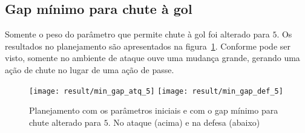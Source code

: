 \subsection{Gap mínimo para chute à gol}
Somente o peso do parâmetro que permite chute à gol
foi alterado para $5$. Os resultados no planejamento são
apresentados na figura~\ref{fig:min_gap_5}. Conforme pode
ser visto, somente no ambiente de ataque ouve uma
mudança grande, gerando uma ação de chute no lugar de
uma ação de passe.
\begin{figure}[H]
  \centering
  \texttt{[image: result/min\_gap\_atq\_5]}
  \texttt{[image: result/min\_gap\_def\_5]}
  \caption{Planejamento com os parâmetros iniciais e com o gap
           mínimo para chute alterado para $5$.
           No ataque (acima) e na defesa (abaixo)}\label{fig:min_gap_5}
\end{figure}
